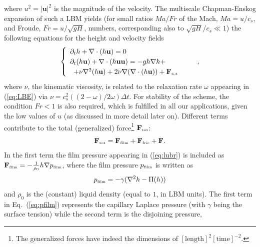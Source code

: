 where $u^2 = |\mathbf{u}|^2$ is the magnitude of the velocity.
The multiscale Chapman-Enskog expansion \cite{chapmanMathematicalTheoryNonuniform1990,enskogKinetischeTheorieVorgange1917} of such a LBM yields (for small ratios $Ma/Fr$ of the Mach, $Ma=u/c_s$, and Froude, $Fr = u/\sqrt{gH}$, numbers, corresponding also to $\sqrt{g H}/c_s \ll 1$) the following equations for the height and velocity fields~\cite{dellarNonhydrodynamicModesPriori2002,vanthangStudy1DLattice2010,salmonLatticeBoltzmannMethod1999}
\begin{equation}\label{eq:hydro}
\begin{cases}
\begin{array}{ll}
\partial_t h + \nabla \cdot (h \mathbf{u})  = 0 & \\ 
\partial_t (h \mathbf{u}) + \nabla \cdot (h \mathbf{u}\mathbf{u}) = -gh \nabla h +\\ 
\,\,\, +  \nu \nabla^2 (h\mathbf{u}) + 2\nu \nabla (\nabla \cdot (h\mathbf{u})) +
\mathbf{F}_{\mbox{\tiny{tot}}} 
\end{array}
\end{cases},
\end{equation}
where $\nu$, the kinematic viscosity, is related to the relaxation rate $\omega$ appearing in (\ref{eq:LBE}) via $\nu = c_s^2((2-\omega)/2\omega)\Delta t$. 
For stability of the scheme, the condition $Fr < 1$ is also required, which is fulfilled in all our applications, given the low values of $u$ (as discussed in more detail later on).
Different terms contribute to the total (generalized) force\footnote{The generalized forces have indeed the dimensions of $[\mbox{length}]^2[\mbox{time}]^{-2}$.} $\mathbf{F}_{\mbox{\tiny{tot}}}$:
\begin{equation}\label{eq:force}
\mathbf{F}_{\mbox{\tiny{tot}}} = \mathbf{F}_{\mbox{\tiny{film}}} + \mathbf{F}_{\mbox{\tiny{fric}}} + \mathbf{F}. 
\end{equation}
In the first term the film pressure appearing in (\ref{eq:lubr}) is included as
$\mathbf{F}_{\mbox{\tiny{film}}} = -\frac{1}{\rho_0}h\nabla p_{\mbox{\tiny{film}}}$, where the film pressure $p_{\mbox{\tiny{film}}}$ 
is written as
\begin{equation}\label{eq:pfilm}
p_{\mbox{\tiny{film}}} = - \gamma (\nabla^2 h -\Pi(h))
\end{equation}
and $\rho_0$ is the (constant) liquid density (equal to $1$, in LBM units). 
The first term in Eq.~(\ref{eq:pfilm}) represents the capillary Laplace pressure (with $\gamma$ being the surface tension) while the second term is the disjoining pressure, 
